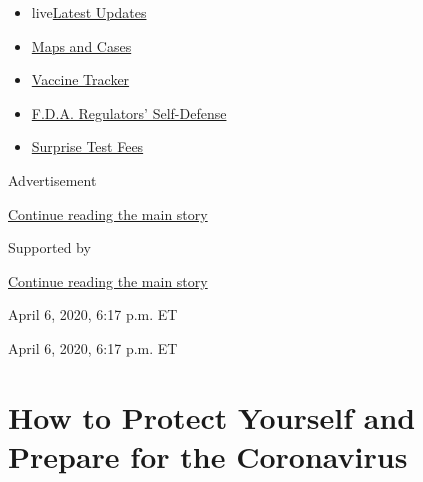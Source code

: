 \begin{itemize}
\tightlist
\item
  live\href{https://www.nytimes3xbfgragh.onion/2020/09/11/world/covid-19-coronavirus.html?name=styln-coronavirus\&region=TOP_BANNER\&block=storyline_menu_recirc\&action=click\&pgtype=Article\&impression_id=1cdb10e0-f4b8-11ea-8069-9bc7b2cf9d32\&variant=undefined}{Latest
  Updates}
\item
  \href{https://www.nytimes3xbfgragh.onion/interactive/2020/us/coronavirus-us-cases.html?name=styln-coronavirus\&region=TOP_BANNER\&block=storyline_menu_recirc\&action=click\&pgtype=Article\&impression_id=1cdb10e1-f4b8-11ea-8069-9bc7b2cf9d32\&variant=undefined}{Maps
  and Cases}
\item
  \href{https://www.nytimes3xbfgragh.onion/interactive/2020/science/coronavirus-vaccine-tracker.html?name=styln-coronavirus\&region=TOP_BANNER\&block=storyline_menu_recirc\&action=click\&pgtype=Article\&impression_id=1cdb10e2-f4b8-11ea-8069-9bc7b2cf9d32\&variant=undefined}{Vaccine
  Tracker}
\item
  \href{https://www.nytimes3xbfgragh.onion/2020/09/10/us/politics/fda-coronavirus-vaccine.html?name=styln-coronavirus\&region=TOP_BANNER\&block=storyline_menu_recirc\&action=click\&pgtype=Article\&impression_id=1cdb10e3-f4b8-11ea-8069-9bc7b2cf9d32\&variant=undefined}{F.D.A.
  Regulators' Self-Defense}
\item
  \href{https://www.nytimes3xbfgragh.onion/2020/09/09/upshot/coronavirus-surprise-test-fees.html?name=styln-coronavirus\&region=TOP_BANNER\&block=storyline_menu_recirc\&action=click\&pgtype=Article\&impression_id=1cdb10e4-f4b8-11ea-8069-9bc7b2cf9d32\&variant=undefined}{Surprise
  Test Fees}
\end{itemize}

Advertisement

\protect\hyperlink{after-top}{Continue reading the main story}

Supported by

\protect\hyperlink{after-sponsor}{Continue reading the main story}

April 6, 2020, 6:17 p.m. ET

April 6, 2020, 6:17 p.m. ET

\hypertarget{how-to-protect-yourself-and-prepare-for-the-coronavirus}{%
\section{How to Protect Yourself and Prepare for the
Coronavirus}\label{how-to-protect-yourself-and-prepare-for-the-coronavirus}}

